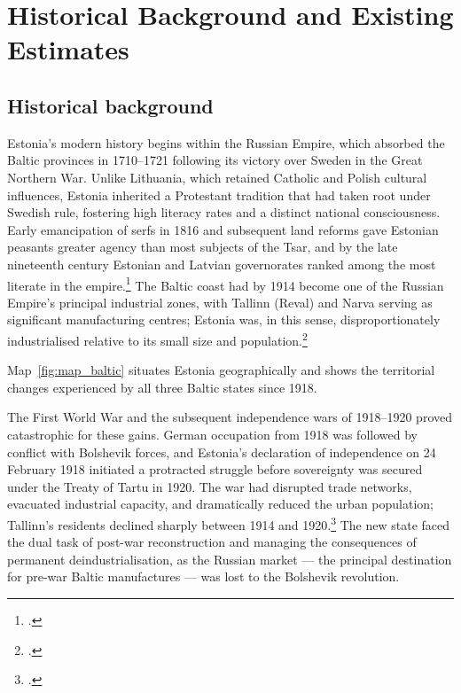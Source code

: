 \documentclass[12pt,a4paper]{article}
\begin{document}
\section{Historical Background and Existing Estimates}
\label{sec:background}

\subsection{Historical background}
\label{subsec:history}

Estonia's modern history begins within the Russian Empire, which absorbed the Baltic provinces in 1710--1721 following its victory over Sweden in the Great Northern War. Unlike Lithuania, which retained Catholic and Polish cultural influences, Estonia inherited a Protestant tradition that had taken root under Swedish rule, fostering high literacy rates and a distinct national consciousness. Early emancipation of serfs in 1816 and subsequent land reforms gave Estonian peasants greater agency than most subjects of the Tsar, and by the late nineteenth century Estonian and Latvian governorates ranked among the most literate in the empire.\footnote{\autocite[4--5]{baltichistorykasekamp2017}.} The Baltic coast had by 1914 become one of the Russian Empire's principal industrial zones, with Tallinn (Reval) and Narva serving as significant manufacturing centres; Estonia was, in this sense, disproportionately industrialised relative to its small size and population.\footnote{\autocite[102]{ehbaltics_tarvel}.}

Map~\ref{fig:map_baltic} situates Estonia geographically and shows the territorial changes experienced by all three Baltic states since 1918.

The First World War and the subsequent independence wars of 1918--1920 proved catastrophic for these gains. German occupation from 1918 was followed by conflict with Bolshevik forces, and Estonia's declaration of independence on 24 February 1918 initiated a protracted struggle before sovereignty was secured under the Treaty of Tartu in 1920. The war had disrupted trade networks, evacuated industrial capacity, and dramatically reduced the urban population; Tallinn's residents declined sharply between 1914 and 1920.\footnote{\autocite[107]{ehbaltics_tarvel}.} The new state faced the dual task of post-war reconstruction and managing the consequences of permanent deindustrialisation, as the Russian market --- the principal destination for pre-war Baltic manufactures --- was lost to the Bolshevik revolution.
\end{document}
